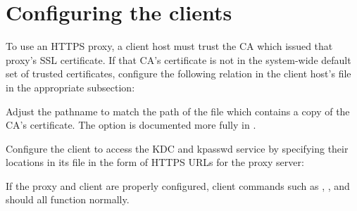 \documentclass[letterpaper,10pt,english]{sphinxmanual}
\begin{document}
\section{Configuring the clients}
\label{\detokenize{admin/https:configuring-the-clients}}
To use an HTTPS proxy, a client host must trust the CA which issued
that proxy’s SSL certificate.  If that CA’s certificate is not in the
system-wide default set of trusted certificates, configure the
following relation in the client host’s {\hyperref[\detokenize{admin/conf_files/krb5_conf:krb5-conf-5}]{}} file in
the appropriate {\hyperref[\detokenize{admin/conf_files/krb5_conf:realms}]{}} subsection:

%
\begin{sphinxVerbatim}[commandchars=\\\{\}]
  
\end{sphinxVerbatim}

Adjust the pathname to match the path of the file which contains a
copy of the CA’s certificate.  The  option is documented
more fully in {\hyperref[\detokenize{admin/conf_files/krb5_conf:krb5-conf-5}]{}}.

Configure the client to access the KDC and kpasswd service by
specifying their locations in its {\hyperref[\detokenize{admin/conf_files/krb5_conf:krb5-conf-5}]{}} file in the form
of HTTPS URLs for the proxy server:

%
\begin{sphinxVerbatim}[commandchars=\\\{\}]
  
  
\end{sphinxVerbatim}

If the proxy and client are properly configured, client commands such
as , , and  should all function normally.
\end{document}
